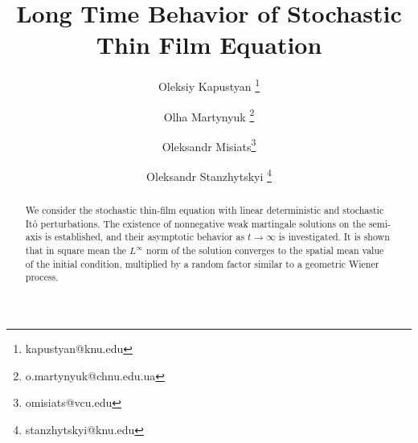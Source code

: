 \documentclass[a4paper,12pt]{article}
\numberwithin{equation}{section}
\begin{document}
\title{Long Time Behavior of Stochastic Thin Film Equation}

\author[1]{Oleksiy Kapustyan \thanks{kapustyan@knu.edu}}

\author[3] {Olha Martynyuk
\thanks{o.martynyuk@chnu.edu.ua}}

\author[2]{Oleksandr Misiats\thanks{omisiats@vcu.edu}}

\author[1]{Oleksandr Stanzhytskyi \thanks{stanzhytskyi@knu.edu}}















\maketitle

\begin{abstract}
We consider the stochastic thin-film equation with linear deterministic and stochastic It\^o perturbations. The existence of nonnegative weak
martingale solutions on the semi-axis is established, and their asymptotic
behavior as $t \to \infty$ is investigated. It is shown that in square mean the $L^\infty$ norm of the solution converges to the spatial mean value of the initial condition, multiplied by a random factor similar to a geometric Wiener process.
\end{abstract}
\end{document}
